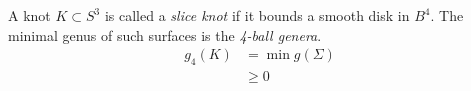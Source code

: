 \begin{defi}
A knot $K \subset S^3$ is called a \emph{slice knot} if it bounds a smooth disk in $B^4$.
The minimal genus of such surfaces is the {\em 4-ball genera}.
\begin{align}
g_4(K) &= \min g(\Sigma) \label{eq}\\ &\ge 0
\end{align}
\end{defi}
